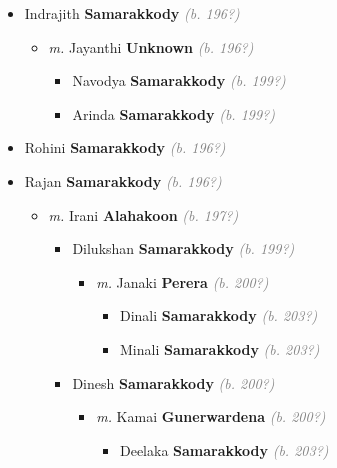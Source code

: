 \documentclass[10pt, openany]{book}
\begin{document}
\begin{itemize}
{\begin{itemize}
{\begin{itemize}
{\begin{itemize}
\item{Indrajith \textbf{Samarakkody} \textcolor{gray}{\textit{(b. 196?)}}
\begin{itemize}
\item{\textit{m.} Jayanthi \textbf{Unknown} \textcolor{gray}{\textit{(b. 196?)}}   \label{couple:00001247:00002411} \begin{itemize}
\item{Navodya \textbf{Samarakkody} \textcolor{gray}{\textit{(b. 199?)}}
 }
\item{Arinda \textbf{Samarakkody} \textcolor{gray}{\textit{(b. 199?)}}
 }
\end{itemize}}
\end{itemize}
 }
\item{Rohini \textbf{Samarakkody} \textcolor{gray}{\textit{(b. 196?)}}
 }
\item{Rajan \textbf{Samarakkody} \textcolor{gray}{\textit{(b. 196?)}}
\begin{itemize}
\item{\textit{m.} Irani \textbf{Alahakoon} \textcolor{gray}{\textit{(b. 197?)}}   \label{couple:00001243:00002400} \begin{itemize}
\item{Dilukshan \textbf{Samarakkody} \textcolor{gray}{\textit{(b. 199?)}}
\begin{itemize}
\item{\textit{m.} Janaki \textbf{Perera} \textcolor{gray}{\textit{(b. 200?)}}   \label{couple:00001244:00002401} \begin{itemize}
\item{Dinali \textbf{Samarakkody} \textcolor{gray}{\textit{(b. 203?)}}
 }
\item{Minali \textbf{Samarakkody} \textcolor{gray}{\textit{(b. 203?)}}
 }
\end{itemize}}
\end{itemize}
 }
\item{Dinesh \textbf{Samarakkody} \textcolor{gray}{\textit{(b. 200?)}}
\begin{itemize}
\item{\textit{m.} Kamai \textbf{Gunerwardena} \textcolor{gray}{\textit{(b. 200?)}}   \label{couple:00001245:00002404} \begin{itemize}
\item{Deelaka \textbf{Samarakkody} \textcolor{gray}{\textit{(b. 203?)}}
}
\end{itemize}}
\end{itemize}}
\end{itemize}}
\end{itemize}}
\end{itemize}}
\end{itemize}}
\end{itemize}}
\end{itemize}
\end{document}
